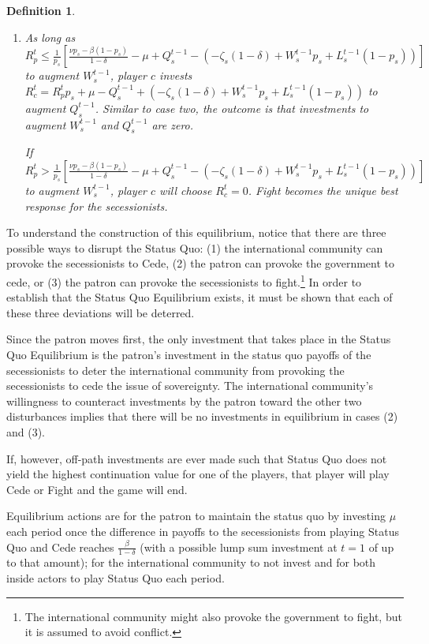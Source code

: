 \documentclass[11pt,letterpaper, notitlepage]{article}
\newtheorem{definition}{Definition}
\newcommand{\de}{\delta}
\begin{document}
\begin{definition}
\begin{enumerate}
If $R_p^t > \frac{\nu}{1-\de} + \left( Q_g^{t-1} - L_g^{t-1}\right)$ to augment $L_g^{t-1}$, player $c$ invests $R_c^t = 0$. Cede becomes the unique best response for the government.

	\item As long as $R_p^t \leq \frac{1}{p_s} \left[\frac{\nu p_s - \beta (1-p_s)}{1 -\de} - \mu + Q_s^{t-1} - \left(-\zeta_{s}(1-\de) + W_s^{t-1}p_s + L_s^{t-1}(1-p_s)\right)\right]$ to augment $W_s^{t-1}$, player $c$ invests $R_c^t = R_p^tp_s + \mu - Q_s^{t-1} + \left(-\zeta_{s}(1-\de) + W_s^{t-1}p_s + L_s^{t-1}(1-p_s)\right)$ to augment $Q_s^{t-1}$. Similar to case two, the outcome is that investments to augment $W_s^{t-1}$ and $Q_s^{t-1}$ are zero.

If $R_p^t > \frac{1}{p_s}\left[\frac{\nu p_s - \beta (1-p_s)}{1 -\de} - \mu + Q_s^{t-1} - \left(-\zeta_{s}(1-\de) + W_s^{t-1}p_s + L_s^{t-1}(1-p_s)\right)\right] $ to augment $W_s^{t-1}$, player $c$ will choose $R_c^t=0$. Fight becomes the unique best response for the secessionists.
\end{enumerate}
\end{definition}

To understand the construction of this equilibrium, notice that there are three possible ways to disrupt the Status Quo: (1) the international community can provoke the secessionists to Cede, (2) the patron can provoke the government to cede, or (3) the patron can provoke the secessionists to fight.\footnote{The international community might also provoke the government to fight, but it is assumed to avoid conflict.} In order to establish that the Status Quo Equilibrium exists, it must be shown that each of these three deviations will be deterred.

Since the patron moves first, the only investment that takes place in the Status Quo Equilibrium is the patron's investment in the status quo payoffs of the secessionists to deter the international community from provoking the secessionists to cede the issue of sovereignty. The international community's willingness to counteract investments by the patron toward the other two disturbances implies that there will be no investments in equilibrium in cases (2) and (3).

If, however, off-path investments are ever made such that Status Quo does not yield the highest continuation value for one of the players, that player will play Cede or Fight and the game will end.

Equilibrium actions are for the patron to maintain the status quo by investing $\mu$ each period once the difference in payoffs to the secessionists from playing Status Quo and Cede reaches $\frac{\beta}{1-\de}$ (with a possible lump sum investment at $t=1$ of up to that amount); for the international community to not invest and for both inside actors to play Status Quo each period.
\end{document}
